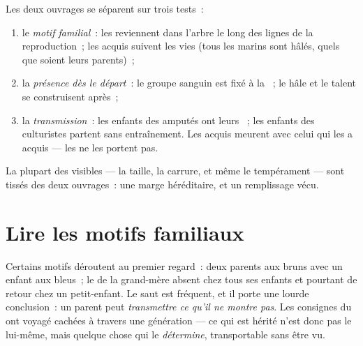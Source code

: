 \begin{proposition}\label{prop:g9:heredity-and-traits:sorting}
Les deux ouvrages se séparent sur trois tests~:
\begin{enumerate}
  \item le \emph{motif familial}~: les  reviennent dans l'arbre le long des
        lignes de la reproduction~; les  acquis
        suivent les vies (tous les marins sont hâlés, quels
        que soient leurs parents)~;
  \item la \emph{présence dès le départ}~: le groupe
        sanguin est fixé à la ~; le hâle et le
        talent se construisent après~;
  \item la \emph{transmission}~: les enfants des amputés
        ont leurs ~; les enfants des culturistes
        partent sans entraînement. Les  acquis
        meurent avec celui qui les a acquis --- les 
        ne les portent pas.
\end{enumerate}
La plupart des  visibles --- la taille, la
carrure, et même le tempérament --- sont tissés des deux
ouvrages~: une marge héréditaire, et un remplissage vécu.
\end{proposition}
\admitted

\section{Lire les motifs familiaux}

\begin{example}\label{ex:g9:heredity-and-traits:skip}
Certains motifs déroutent au premier regard~: deux parents
aux  bruns avec un enfant aux  bleus~; le 
de la grand-mère absent chez tous ses enfants et pourtant
de retour chez un petit-enfant. Le saut est fréquent, et il
porte une lourde conclusion~: un parent peut
\emph{transmettre ce qu'il ne montre pas}. Les consignes du
 ont voyagé cachées à travers une génération ---
ce qui est hérité n'est donc pas le  lui-même,
mais quelque chose qui le \emph{détermine}, transportable
sans être vu.
\end{example}

